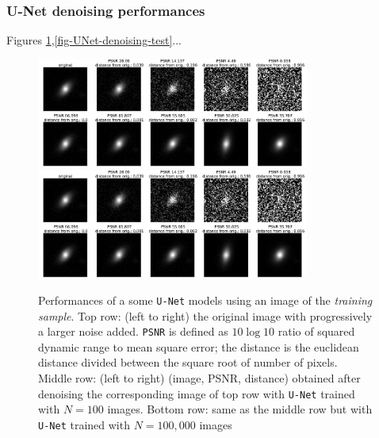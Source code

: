 \documentclass[11pt]{amsart}
\begin{document}
\subsubsection{U-Net denoising performances}
Figures \ref{fig-UNet-denoising-train},\ref{fig-UNet-denoising-test}...
\begin{figure}
    \centering
		\includegraphics[width=0.8\textwidth]{fig-UNet_100_denoising_train.pdf}\\
		\includegraphics[width=0.8\textwidth, trim={0 0 0 25cm},clip=True]{fig-UNet_100_denoising_train.pdf}
	\caption{Performances of a some \texttt{U-Net} models using an image of the \textit{training sample}. Top row: (left to right) the original image with progressively a larger noise added. \texttt{PSNR} is defined as $10 \log10$ ratio of squared dynamic range
to mean square error; the distance is the euclidean distance divided between the square root of number of pixels. Middle row: (left to right) (image, PSNR, distance) obtained after denoising the corresponding image of top row with \texttt{U-Net} trained with  $N=100$ images. Bottom row: same as the middle row but   with \texttt{U-Net} trained with  $N=100,000$ images}
	\label{fig-UNet-denoising-train}
\end{figure}
\end{document}
